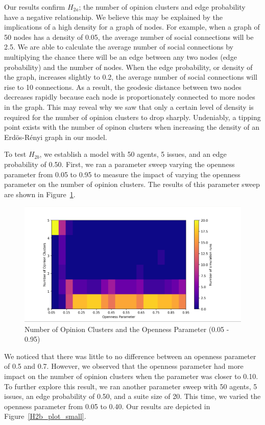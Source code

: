 Our results confirm $H_{2a}$; the number of opinion clusters and edge probability have a negative relationship. We believe this may be explained by the implications of a high density for a graph of nodes. For example, when a graph of 50 nodes has a density of 0.05, the average number of social connections will be 2.5. We are able to calculate the average number of social connections by multiplying the chance there will be an edge between any two nodes (edge probability) and the number of nodes. When the edge probability, or density of the graph, increases slightly to 0.2, the average number of social connections will rise to 10 connections. As a result, the geodesic distance between two nodes decreases rapidly because each node is proportionately connected to more nodes in the graph. This may reveal why we saw that only a certain level of density is required for the number of opinion clusters to drop sharply. Undeniably, a tipping point exists with the number of opinon clusters when increasing the density of an Erd\"{o}s-R\'{e}nyi graph in our model.  

To test $H_{2b}$, we establish a model with 50 agents, 5 issues, and an edge
probability of 0.50. First, we ran a parameter sweep varying the openness
parameter from 0.05 to 0.95 to measure the impact of varying the openness
parameter on the number of opinion clusters. The results of this parameter
sweep are shown in Figure~\ref{H2b_plot_big}.

\begin{figure}
\centering
\includegraphics[width=1.0\columnwidth]{./Graphs/Cluster_openBig.png}
\caption{Number of Opinion Clusters and the Openness Parameter (0.05 - 0.95)}
\label{H2b_plot_big}
\end{figure}

We noticed that there was little to no difference between an openness parameter
of 0.5 and 0.7. However, we observed that the openness parameter had more
impact on the number of opinion clusters when the parameter was closer to 0.10.
To further explore this result, we ran another parameter sweep with 50 agents,
5 issues, an edge probability of 0.50, and a suite size of 20. This time, we
varied the openness parameter from 0.05 to 0.40. Our results are depicted in
Figure~\ref{H2b_plot_small}.

